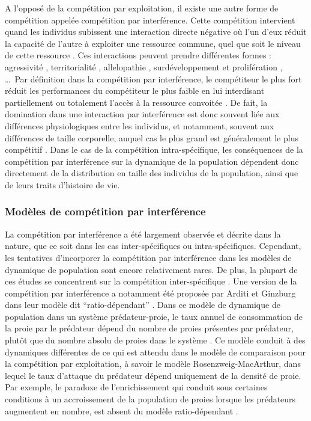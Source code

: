A l'opposé de la compétition par exploitation, il existe une autre forme de
compétition appelée compétition par interférence. Cette compétition intervient
quand les individus subissent une interaction directe négative où l'un d'eux
réduit la capacité de l'autre à exploiter une ressource commune, quel que soit
le niveau de cette ressource \autocites{park1954a,vance1984a}. Ces interactions
peuvent prendre différentes formes : agressivité \autocites{schoener1976a},
territorialité \autocites{walls1990a,kennedy1996a}, allelopathie
\autocites{harper1977a,rice1984a,nilsson1994a}, surdéveloppement et prolifération
\autocites{connell1961a,paine1966a}, \ldots~Par définition dans la compétition
par interférence, le compétiteur le plus fort réduit les performances du
compétiteur le plus faible en lui interdisant
partiellement ou totalement l'accès à la ressource convoitée
\autocites{schoener1983a, thompson1993a}. De fait, la domination dans une
interaction par interférence est donc souvent liée aux différences
physiologiques entre les individus, et notamment, souvent aux différences de
taille corporelle, auquel cas le plus grand est généralement le plus
compétitif \autocites{mccormick2012a}. Dans le cas de la compétition
intra-spécifique, les conséquences de la compétition par interférence sur la
dynamique de la population dépendent donc directement de la distribution en
taille des individus de la population, ainsi que de leurs traits d'histoire de
vie. 

\subsubsection{Modèles de compétition par interférence}

La compétition par interférence a été largement observée et décrite dans la
nature, que ce soit dans les cas inter-spécifiques ou intra-spécifiques.
Cependant, les tentatives d'incorporer la compétition par interférence dans les
modèles de dynamique de population sont encore relativement rares. De plus, la
plupart de ces études se concentrent sur la compétition inter-spécifique
\autocites{case1974a, carothers1984a, vance1984a, adler2000a}. Une version de la
compétition par interférence a notamment été proposée par Arditi et Ginzburg
dans leur modèle dit ``ratio-dépendant''
\autocites{arditi1989a,arditi2012a,arditi1991a}.
Dans ce modèle de dynamique de population dans un système prédateur-proie, le
taux annuel de consommation de la proie par le prédateur dépend du nombre de
proies présentes par prédateur, plutôt que du nombre absolu de proies dans le
système \autocite[voir][pour les détails et dérivations du modèle]{arditi2012a}.
Ce modèle conduit à des dynamiques différentes de ce qui
est attendu dans le modèle de comparaison pour la compétition par exploitation,
à savoir le modèle Rosenzweig-MacArthur, dans lequel le taux d'attaque du
prédateur dépend uniquement de la densité de proie. Par exemple, le paradoxe de
l'enrichissement qui conduit sous certaines conditions à un accroissement de la
population de proies lorsque les prédateurs augmentent en nombre, est absent du
modèle ratio-dépendant \autocites{arditi2012a}. 

